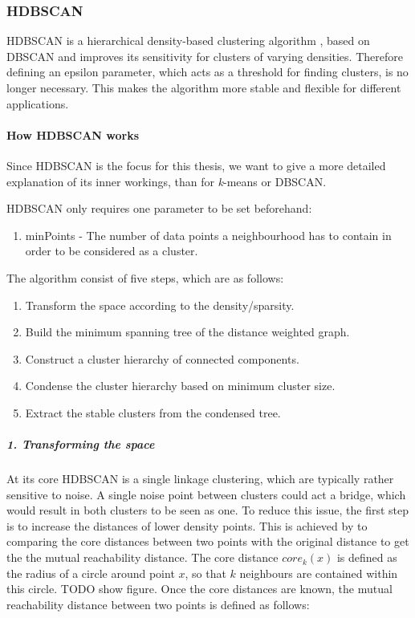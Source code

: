 \subsubsection{HDBSCAN}

HDBSCAN is a hierarchical density-based clustering algorithm \cite{McInnes2017}, based on DBSCAN and improves its sensitivity for clusters of varying densities. Therefore defining an epsilon parameter, which acts as a threshold for finding clusters, is no longer necessary. This makes the algorithm more stable and flexible for different applications. 


\paragraph{How HDBSCAN works}


Since HDBSCAN is the focus for this thesis, we want to give a more detailed explanation of its inner workings, than for \textit{k}-means or DBSCAN.

HDBSCAN only requires one parameter to be set beforehand:
\begin{enumerate}
    \item minPoints - The number of data points a neighbourhood has to contain in order to be considered as a cluster.
\end{enumerate}

The algorithm consist of five steps, which are as follows: 
\begin{enumerate}
    \item Transform the space according to the density/sparsity.
    \item Build the minimum spanning tree of the distance weighted graph.
    \item Construct a cluster hierarchy of connected components.
    \item Condense the cluster hierarchy based on minimum cluster size.
    \item Extract the stable clusters from the condensed tree.
\end{enumerate}

\subparagraph{1. Transforming the space}

At its core HDBSCAN is a single linkage clustering, which are typically rather sensitive to noise. A single noise point between clusters could act a bridge, which would result in both clusters to be seen as one. To reduce this issue, the first step is to increase the distances of lower density points. This is achieved by to comparing the core distances between two points with the original distance to get the the mutual reachability distance. The core distance $core_k(x)$ is defined as the radius of a circle around point $x$, so that $k$ neighbours are contained within this circle. TODO show figure. Once the core distances are known, the mutual reachability distance between two points is defined as follows:

